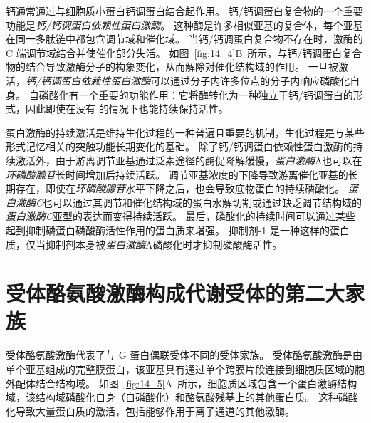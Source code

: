 钙通常通过与细胞质小蛋白钙调蛋白结合起作用。
钙/钙调蛋白复合物的一个重要功能是\textit{钙/钙调蛋白依赖性蛋白激酶}。
这种酶是许多相似亚基的复合体，每个亚基在同一多肽链中都包含调节域和催化域。
当钙/钙调蛋白复合物不存在时，激酶的 C 端调节域结合并使催化部分失活。
如图~\ref{fig:14_4}B~所示，与钙/钙调蛋白复合物的结合导致激酶分子的构象变化，从而解除对催化结构域的作用。
一旦被激活，\textit{钙/钙调蛋白依赖性蛋白激酶}可以通过分子内许多位点的分子内响应磷酸化自身。
自磷酸化有一个重要的功能作用：它将酶转化为一种独立于钙/钙调蛋白的形式，因此即使在没有  的情况下也能持续保持活性。


蛋白激酶的持续激活是维持生化过程的一种普遍且重要的机制，生化过程是与某些形式记忆相关的突触功能长期变化的基础。
除了钙/钙调蛋白依赖性蛋白激酶的持续激活外，由于游离调节亚基通过泛素途径的酶促降解缓慢，\textit{蛋白激酶}A也可以在\textit{环磷酸腺苷}长时间增加后持续活跃。
调节亚基浓度的下降导致游离催化亚基的长期存在，即使在\textit{环磷酸腺苷}水平下降之后，也会导致底物蛋白的持续磷酸化。
\textit{蛋白激酶C}也可以通过其调节和催化结构域的蛋白水解切割或通过缺乏调节结构域的\textit{蛋白激酶C}亚型的表达而变得持续活跃。
最后，磷酸化的持续时间可以通过某些起到抑制磷蛋白磷酸酶活性作用的蛋白质来增强。
抑制剂-1 是一种这样的蛋白质，仅当抑制剂本身被\textit{蛋白激酶}A磷酸化时才抑制磷酸酶活性。



\section{受体酪氨酸激酶构成代谢受体的第二大家族}

受体酪氨酸激酶代表了与 G 蛋白偶联受体不同的受体家族。
受体酪氨酸激酶是由单个亚基组成的完整膜蛋白，该亚基具有通过单个跨膜片段连接到细胞质区域的胞外配体结合结构域。
如图~\ref{fig:14_5}A~所示，细胞质区域包含一个蛋白激酶结构域，该结构域磷酸化自身（自磷酸化）和酪氨酸残基上的其他蛋白质。
这种磷酸化导致大量蛋白质的激活，包括能够作用于离子通道的其他激酶。


